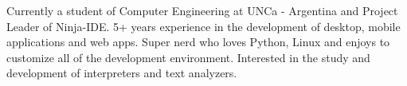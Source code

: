 

\begin{cvparagraph}

Currently a student of Computer Engineering at UNCa - Argentina and Project Leader of Ninja-IDE. 5+ years experience in the development of desktop, mobile applications and web apps. Super nerd who loves Python, Linux and enjoys to customize all of the development environment. Interested in the study and development of interpreters and text analyzers.
\end{cvparagraph}
